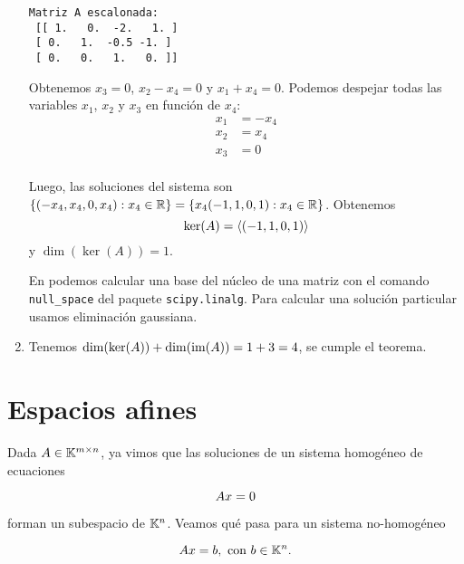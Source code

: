 \begin{ejemplo}
\begin{enumerate}
\begin{verbatim}
Matriz A escalonada:
 [[ 1.   0.  -2.   1. ]
 [ 0.   1.  -0.5 -1. ]
 [ 0.   0.   1.   0. ]]
\end{verbatim}



Obtenemos $x_3 = 0$, $x_2 - x_4 = 0$ y $x_1 + x_4=0$. Podemos despejar todas las variables $x_1$, $x_2$ y $x_3$ en función de $x_4$:
\begin{align*}
x_1 &= -x_4 \\
x_2 &= x_4  \\
x_3 &= 0   \\
\end{align*}

Luego, las soluciones del sistema son $\{(-x_4, x_4, 0, x_4): x_4 \in \mathbb R\} = \{x_4(-1, 1, 0, 1): x_4 \in \mathbb R\}$. Obtenemos $$
\ker(\Ab) = \langle (-1, 1, 0, 1) \rangle
$$ y $\dim(\ker(A)) = 1$.

En \python podemos calcular una base del núcleo de una matriz con el comando \texttt{null\_space} del paquete \texttt{scipy.linalg}. Para calcular una solución particular usamos eliminación gaussiana.

\item Tenemos $\dim(\ker(\Ab)) + \dim(\im(\Ab)) = 1 + 3 = 4$, se cumple el teorema.

\end{enumerate}

\end{ejemplo}




\section{Espacios afines}

Dada $\Ab \in \K^{m \times n}$, ya vimos que las soluciones de un sistema
homogéneo de ecuaciones

$$
\Ab\xb = 0
$$

forman un subespacio de $\mathbb K^n$. Veamos qué pasa para un sistema
no-homogéneo

$$
\Ab\xb = \bb, \text{ con } \bb \in \K^n.
$$

